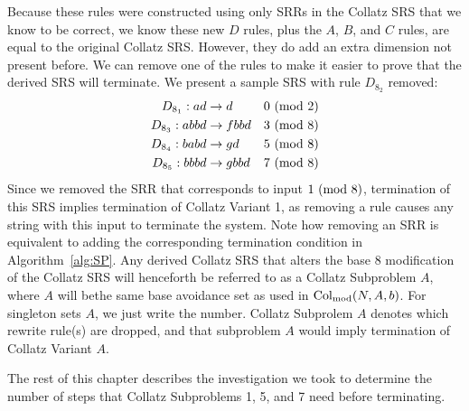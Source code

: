 Because these rules were constructed using only SRRs in the Collatz SRS that we know to be correct, we know these new $D$ rules, plus the $A$, $B$, and $C$ rules, are equal to the original Collatz SRS. However, they do add an extra dimension not present before. We can remove one of the rules to make it easier to prove that the derived SRS will terminate. We present a sample SRS with rule $D_{8_2}$ removed:
\begin{align*}
    D_{8_1}: ad &\rightarrow d &\text{$0\ (\mathrm{mod}\ 2)$}\\
    D_{8_3}: abbd &\rightarrow fbbd &\text{$3\ (\mathrm{mod}\ 8)$}\\
    D_{8_4}: babd &\rightarrow gd &\text{$5\ (\mathrm{mod}\ 8)$}\\
    D_{8_5}: bbbd &\rightarrow gbbd &\text{$7\ (\mathrm{mod}\ 8)$}
\end{align*}
Since we removed the SRR that corresponds to input $1 \ (\mathrm{mod}\ 8)$, termination of this SRS implies termination of Collatz Variant 1, as removing a rule causes any string with this input to terminate the system. Note how removing an SRR is equivalent to adding the corresponding termination condition in Algorithm~\ref{alg:SP}. Any derived Collatz SRS that alters the base 8 modification of the Collatz SRS will henceforth be referred to as a Collatz Subproblem $A$, where $A$ will bethe same base avoidance set as used in $\mathrm{Col}_{\text{mod}}(N,A,b)$. For singleton sets $A$, we just write the number. Collatz Subprolem $A$ denotes which rewrite rule(s) are dropped, and that subproblem $A$ would imply termination of Collatz Variant $A$.\par
The rest of this chapter describes the investigation we took to determine the number of steps that Collatz Subproblems 1, 5, and 7 need before terminating.
